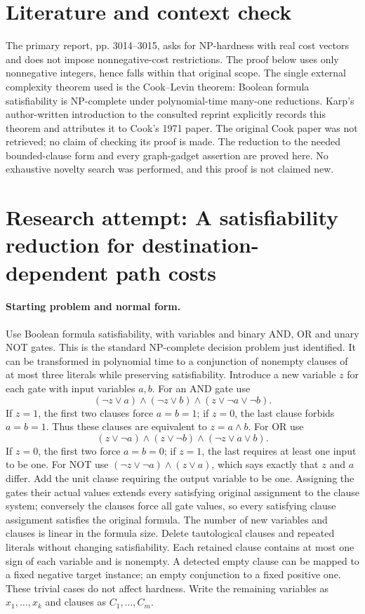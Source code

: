 \documentclass[11pt]{article}
\begin{document}
\section{Literature and context check}
The primary report, pp. 3014--3015, asks for NP-hardness with real cost vectors and does not impose nonnegative-cost restrictions. The proof below uses only nonnegative integers, hence falls within that original scope. The single external complexity theorem used is the Cook--Levin theorem: Boolean formula satisfiability is NP-complete under polynomial-time many-one reductions. Karp's author-written introduction to the consulted reprint explicitly records this theorem and attributes it to Cook's 1971 paper. The original Cook paper was not retrieved; no claim of checking its proof is made. The reduction to the needed bounded-clause form and every graph-gadget assertion are proved here. No exhaustive novelty search was performed, and this proof is not claimed new.
\section{Research attempt: A satisfiability reduction for destination-dependent path costs}
\paragraph{Starting problem and normal form.}
Use Boolean formula satisfiability, with variables and binary AND, OR and unary NOT gates. This is the standard NP-complete decision problem just identified. It can be transformed in polynomial time to a conjunction of nonempty clauses of at most three literals while preserving satisfiability. Introduce a new variable $z$ for each gate with input variables $a,b$. For an AND gate use
\[
(\neg z\vee a)\wedge(\neg z\vee b)\wedge(z\vee\neg a\vee\neg b).
\]
If $z=1$, the first two clauses force $a=b=1$; if $z=0$, the last clause forbids $a=b=1$. Thus these clauses are equivalent to $z=a\wedge b$. For OR use
\[
(z\vee\neg a)\wedge(z\vee\neg b)\wedge(\neg z\vee a\vee b).
\]
If $z=0$, the first two force $a=b=0$; if $z=1$, the last requires at least one input to be one. For NOT use $(\neg z\vee\neg a)\wedge(z\vee a)$, which says exactly that $z$ and $a$ differ. Add the unit clause requiring the output variable to be one. Assigning the gates their actual values extends every satisfying original assignment to the clause system; conversely the clauses force all gate values, so every satisfying clause assignment satisfies the original formula. The number of new variables and clauses is linear in the formula size.
Delete tautological clauses and repeated literals without changing satisfiability. Each retained clause contains at most one sign of each variable and is nonempty. A detected empty clause can be mapped to a fixed negative target instance; an empty conjunction to a fixed positive one. These trivial cases do not affect hardness. Write the remaining variables as $x_1,\ldots,x_k$ and clauses as $C_1,\ldots,C_m$.
\end{document}
